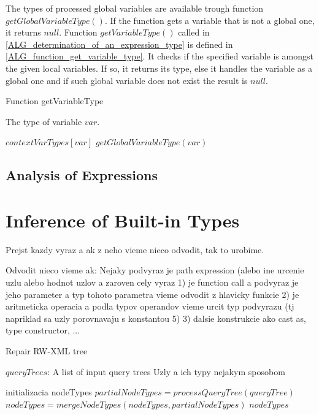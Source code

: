 The types of processed global variables are available trough function $getGlobalVariableType()$. If the function gets a variable that is not a global one, it returns $null$. Function $getVariableType()$ called in \ref{ALG_determination_of_an_expression_type} is defined in \ref{ALG_function_get_variable_type}. It checks if the specified variable is amongst the given local variables. If so, it returns its type, else it handles the variable as a global one and if such global variable does not exist the result is $null$.

\begin{algorithm}
\caption{Function getVariableType}
\label{ALG_function_get_variable_type}
\begin{algorithmic}[1]
\ENSURE The type of variable $var$.

     \RETURN $contextVarTypes[var]$
\ELSE
     \RETURN $getGlobalVariableType(var)$
\ENDIF
\end{algorithmic}
\end{algorithm}

\subsection{Analysis of Expressions}


\section{Inference of Built-in Types}
Prejst kazdy vyraz a ak z neho vieme nieco odvodit, tak to urobime.

Odvodit nieco vieme ak:
Nejaky podvyraz je path expression (alebo ine urcenie uzlu alebo hodnot uzlov 
a zaroven cely vyraz
1) je function call a podvyraz je jeho parameter a typ tohoto parametra vieme odvodit z hlavicky funkcie
2) je aritmeticka operacia a podla typov operandov vieme urcit typ podvyrazu (tj napriklad sa uzly porovnavaju s konstantou 5) 
3) dalsie konstrukcie ako cast as, type constructor, ... 



\begin{algorithm}
\caption{Repair RW-XML tree}
\label{propAlgo}
\begin{algorithmic}[1]
\REQUIRE $queryTrees$: A list of input query trees
\ENSURE Uzly a ich typy nejakym sposobom

\STATE initializacia nodeTypes
    \STATE $partialNodeTypes = processQueryTree(queryTree)$
    \STATE $nodeTypes = mergeNodeTypes(nodeTypes, partialNodeTypes)$
\ENDFOR
\RETURN $nodeTypes$
\end{algorithmic}
\end{algorithm}

